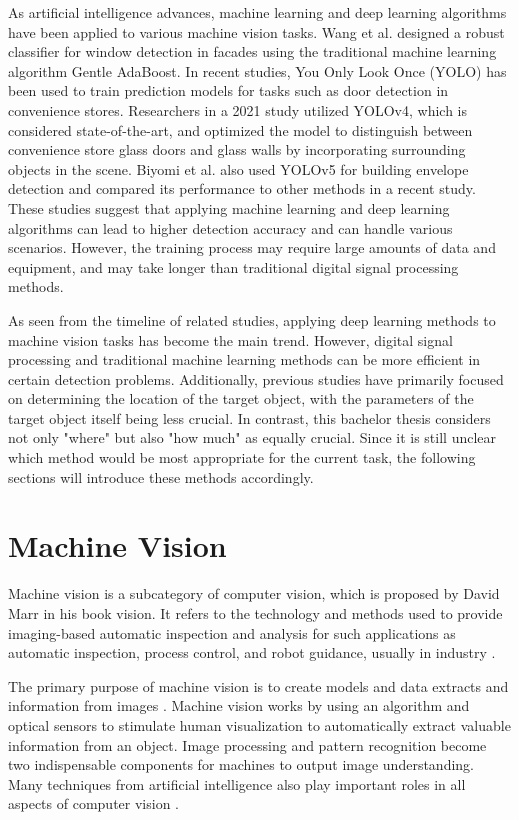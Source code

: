 As artificial intelligence advances, machine learning and deep learning algorithms have been applied to various machine vision tasks. Wang et al. designed a robust classifier for window detection in facades using the traditional machine learning algorithm Gentle AdaBoost. In recent studies, You Only Look Once (YOLO) has been used to train prediction models for tasks such as door detection in convenience stores. Researchers in a 2021 study utilized YOLOv4, which is considered state-of-the-art, and optimized the model to distinguish between convenience store glass doors and glass walls by incorporating surrounding objects in the scene. Biyomi et al. also used YOLOv5 for building envelope detection and compared its performance to other methods in a recent study. These studies suggest that applying machine learning and deep learning algorithms can lead to higher detection accuracy and can handle various scenarios. However, the training process may require large amounts of data and equipment, and may take longer than traditional digital signal processing methods.

As seen from the timeline of related studies, applying deep learning methods to machine vision tasks has become the main trend. However, digital signal processing and traditional machine learning methods can be more efficient in certain detection problems. Additionally, previous studies have primarily focused on determining the location of the target object, with the parameters of the target object itself being less crucial. In contrast, this bachelor thesis considers not only "where" but also "how much" as equally crucial. Since it is still unclear which method would be most appropriate for the current task, the following sections will introduce these methods accordingly.

\section{Machine Vision}

Machine vision is a subcategory of computer vision, which is proposed by David Marr in his book vision\cite{marr_vision_2010}. It refers to the technology and methods used to provide imaging-based automatic inspection and analysis for such applications as automatic inspection, process control, and robot guidance, usually in industry \cite{steger_machine_2018}.

The primary purpose of machine vision is to create models and data extracts and information from images \cite{wiley_computer_2018}. Machine vision works by using an algorithm and optical sensors to stimulate human visualization to automatically extract valuable information from an object. Image processing and pattern recognition become two indispensable components for machines to output image understanding. Many techniques from artificial intelligence also play important roles in all aspects of computer vision \cite{jain_machine_1995}.

